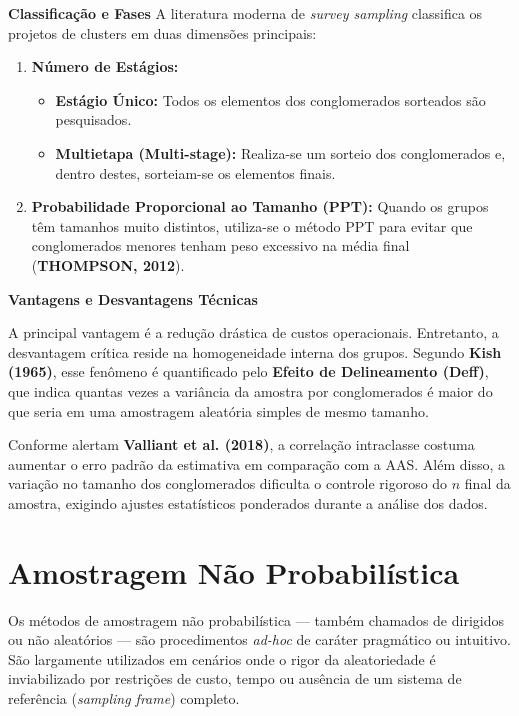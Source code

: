 \textbf{Classificação e Fases}
\vskip0.3cm
A literatura moderna de \textit{survey sampling} classifica os projetos de clusters em duas dimensões principais:
\begin{enumerate}
    \item \textbf{Número de Estágios:} 
    \begin{itemize}
        \item \textbf{Estágio Único:} Todos os elementos dos conglomerados sorteados são pesquisados.
        \item \textbf{Multietapa (Multi-stage):} Realiza-se um sorteio dos conglomerados e, dentro destes, sorteiam-se os elementos finais.
    \end{itemize}
    \item \textbf{Probabilidade Proporcional ao Tamanho (PPT):} Quando os grupos têm tamanhos muito distintos, utiliza-se o método PPT para evitar que conglomerados menores tenham peso excessivo na média final (\textbf{THOMPSON, 2012}).
\end{enumerate}

\newpage
\textbf{Vantagens e Desvantagens Técnicas}
\vskip0.3cm

A principal vantagem é a redução drástica de custos operacionais. Entretanto, a desvantagem crítica reside na homogeneidade interna dos grupos. Segundo \textbf{Kish (1965)}, esse fenômeno é quantificado pelo \textbf{Efeito de Delineamento (Deff)}, que indica quantas vezes a variância da amostra por conglomerados é maior do que seria em uma amostragem aleatória simples de mesmo tamanho.
\vskip0.3cm

Conforme alertam \textbf{Valliant et al. (2018)}, a correlação intraclasse costuma aumentar o erro padrão da estimativa em comparação com a AAS. Além disso, a variação no tamanho dos conglomerados dificulta o controle rigoroso do $n$ final da amostra, exigindo ajustes estatísticos ponderados durante a análise dos dados.





\section{Amostragem Não Probabilística}

Os métodos de amostragem não probabilística — também chamados de dirigidos ou não aleatórios — são procedimentos \textit{ad-hoc} de caráter pragmático ou intuitivo. São largamente utilizados em cenários onde o rigor da aleatoriedade é inviabilizado por restrições de custo, tempo ou ausência de um sistema de referência (\textit{sampling frame}) completo. \vskip0.3cm

